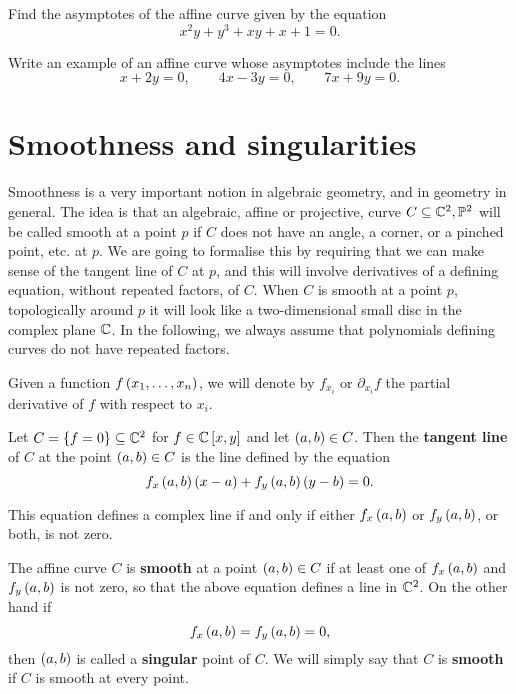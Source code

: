 \begin{exercise}
Find the asymptotes of the affine curve given by the equation
$$ x^2y + y^3 + xy + x + 1 = 0. $$
\end{exercise}

\begin{exercise}
Write an example of an affine curve whose asymptotes include the lines
$$ x + 2y = 0, \qquad 4x - 3y = 0, \qquad 7x + 9y = 0. $$
\end{exercise}

\pagebreak

\section{Smoothness and singularities}


Smoothness is a very important notion in algebraic geometry, and in geometry in general. The idea is that an algebraic, affine or projective, curve $ C \subseteq \mathbb{C}^2, \mathbb{P}^2 $ will be called smooth at a point $ p $ if $ C $ does not have an angle, a corner, or a pinched point, etc. at $ p $. We are going to formalise this by requiring that we can make sense of the tangent line of $ C $ at $ p $, and this will involve derivatives of a defining equation, without repeated factors, of $ C $. When $ C $ is smooth at a point $ p $, topologically around $ p $ it will look like a two-dimensional small disc in the complex plane $ \mathbb{C} $. In the following, we always assume that polynomials defining curves do not have repeated factors.

\begin{notation}
Given a function $ f\br{x_1, \dots, x_n} $, we will denote by $ f_{x_i} $ or $ \partial_{x_i}f $ the partial derivative of $ f $ with respect to $ x_i $.
\end{notation}

Let $ C = \cbr{f = 0} \subseteq \C^2 $ for $ f \in \C\sbr{x, y} $ and let $ \br{a, b} \in C $. Then the \textbf{tangent line} of $ C $ at the point $ \br{a, b} \in C $ is the line defined by the equation
$$ f_x\br{a, b}\br{x - a} + f_y\br{a, b}\br{y - b} = 0. $$

\begin{note*}
This equation defines a complex line if and only if either $ f_x\br{a, b} $ or $ f_y\br{a, b} $, or both, is not zero.
\end{note*}

\begin{definition}
The affine curve $ C $ is \textbf{smooth} at a point $ \br{a, b} \in C $ if at least one of $ f_x\br{a, b} $ and $ f_y\br{a, b} $ is not zero, so that the above equation defines a line in $ \mathbb{C}^2 $. On the other hand if
$$ f_x\br{a, b} = f_y\br{a, b} = 0, $$
then $ \br{a, b} $ is called a \textbf{singular} point of $ C $. We will simply say that $ C $ is \textbf{smooth} if $ C $ is smooth at every point.
\end{definition}

